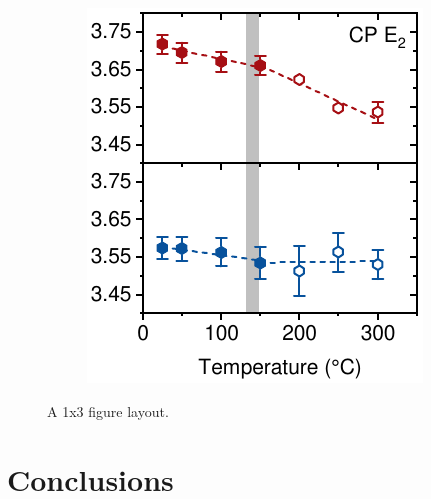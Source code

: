 \begin{figure}[htbp]
\begin{subfigure}{0.31\textwidth}
        \caption{}
        \label{fig:ellipsometry:CP1}
    \end{subfigure}
    \hfill
    \begin{subfigure}{0.31\textwidth}
        \includegraphics[width=\textwidth]{chapters/ellipsometry/image/CP3}
        \caption{}
        \label{fig:ellipsometry:deriv:CP2}
    \end{subfigure}
    \caption{A 1x3 figure layout.}
    \label{fig:ellipsometry:CP_all}
\end{figure}



\section{Conclusions}


\cleardoublepage

